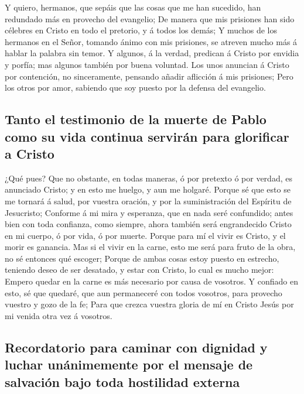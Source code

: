  Y quiero, hermanos, que sepáis que las cosas que me han
sucedido, han redundado más en provecho del evangelio;  De
manera que mis prisiones han sido célebres en Cristo en todo el
pretorio, y á todos los demás;  Y muchos de los hermanos en
el Señor, tomando ánimo con mis prisiones, se atreven mucho más á hablar
la palabra sin temor.  Y algunos, á la verdad, predican á
Cristo por envidia y porfía; mas algunos también por buena voluntad.
 Los unos anuncian á Cristo por contención, no
sinceramente, pensando añadir aflicción á mis prisiones; 
Pero los otros por amor, sabiendo que soy puesto por la defensa del
evangelio.

\hypertarget{tanto-el-testimonio-de-la-muerte-de-pablo-como-su-vida-continua-serviruxe1n-para-glorificar-a-cristo}{%
\subsection{Tanto el testimonio de la muerte de Pablo como su vida
continua servirán para glorificar a
Cristo}\label{tanto-el-testimonio-de-la-muerte-de-pablo-como-su-vida-continua-serviruxe1n-para-glorificar-a-cristo}}

 ¿Qué pues? Que no obstante, en todas maneras, ó por
pretexto ó por verdad, es anunciado Cristo; y en esto me huelgo, y aun
me holgaré.  Porque sé que esto se me tornará á salud, por
vuestra oración, y por la suministración del Espíritu de Jesucristo;
 Conforme á mi mira y esperanza, que en nada seré
confundido; antes bien con toda confianza, como siempre, ahora también
será engrandecido Cristo en mi cuerpo, ó por vida, ó por muerte.
 Porque para mí el vivir es Cristo, y el morir es ganancia.
 Mas si el vivir en la carne, esto me será para fruto de la
obra, no sé entonces qué escoger;  Porque de ambas cosas
estoy puesto en estrecho, teniendo deseo de ser desatado, y estar con
Cristo, lo cual es mucho mejor:  Empero quedar en la carne
es más necesario por causa de vosotros.  Y confiado en
esto, sé que quedaré, que aun permaneceré con todos vosotros, para
provecho vuestro y gozo de la fe;  Para que crezca vuestra
gloria de mí en Cristo Jesús por mi venida otra vez á vosotros.

\hypertarget{recordatorio-para-caminar-con-dignidad-y-luchar-unuxe1nimemente-por-el-mensaje-de-salvaciuxf3n-bajo-toda-hostilidad-externa}{%
\subsection{Recordatorio para caminar con dignidad y luchar unánimemente
por el mensaje de salvación bajo toda hostilidad
externa}\label{recordatorio-para-caminar-con-dignidad-y-luchar-unuxe1nimemente-por-el-mensaje-de-salvaciuxf3n-bajo-toda-hostilidad-externa}}

